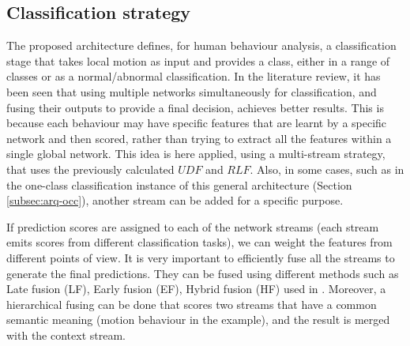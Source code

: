 \subsection{Classification strategy} \label{sec:architecture:multistream}


The proposed architecture defines, for human behaviour analysis, a classification stage that takes local motion as input and provides a class, either in a range of classes or as a normal/abnormal classification. In the literature review, it has been seen that using multiple networks simultaneously for classification, and fusing their outputs to provide a final decision, achieves better results. This is because each behaviour may have specific features that are learnt by a specific network and then scored, rather than trying to extract all the features within a single global network. This idea is here applied, using a multi-stream strategy, that uses the previously calculated $UDF$ and $RLF$. Also, in some cases, such as in the one-class classification instance of this general architecture (Section \ref{subsec:arq-occ}), another stream can be added for a specific purpose. 

If prediction scores are assigned to each of the network streams (each stream emits scores from different classification tasks), we can weight the features from different points of view. It is very important to efficiently fuse all the streams to generate the final predictions. They can be fused using different methods such as Late fusion (LF), Early fusion (EF), Hybrid fusion (HF) used in \cite{zalluhoglu2019region}. Moreover, a hierarchical fusing can be done that scores two streams that have a common semantic meaning (motion behaviour in the example), and the result is merged with the context stream. 


